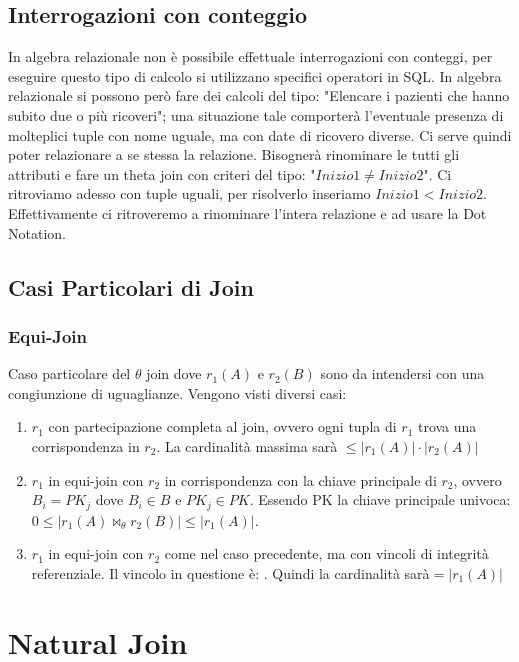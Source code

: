 \documentclass[10pt,twocolumn]{article}
\begin{document}
\subsection{Interrogazioni con conteggio}
In algebra relazionale non è possibile effettuale interrogazioni con conteggi, per eseguire questo tipo di calcolo si utilizzano specifici operatori in SQL. In algebra relazionale si possono però fare dei calcoli del tipo: "Elencare i pazienti che hanno subito due o più ricoveri"; una situazione tale comporterà l'eventuale presenza di molteplici tuple con nome uguale, ma con date di ricovero diverse. Ci serve quindi poter relazionare a se stessa la relazione.
\newline Bisognerà rinominare le tutti gli attributi e fare un theta join con criteri del tipo: "$Inizio1 \neq Inizio2$".
Ci ritroviamo adesso con tuple uguali, per risolverlo inseriamo $Inizio1 < Inizio2$.
Effettivamente ci ritroveremo a rinominare l'intera relazione e ad usare la Dot Notation.
\subsection{Casi Particolari di Join}
\subsubsection{Equi-Join}
Caso particolare del $\theta$ join dove $r_1(A)$ e $r_2(B)$ sono da intendersi con una congiunzione di uguaglianze.
Vengono visti diversi casi:
\begin{enumerate}
    \item $r_1$ con partecipazione completa al join, ovvero ogni tupla di $r_1$ trova una corrispondenza in $r_2$. La cardinalità massima sarà $\leq |r_1(A)|\cdot|r_2(A)|$
    \item $r_1$ in equi-join con $r_2$ in corrispondenza con la chiave principale di $r_2$, ovvero \newline $B_i = PK_j$ dove $B_i \in B$ e $PK_j \in PK$. Essendo PK la chiave principale univoca: \newline $0 \leq |r_1(A)\bowtie_\theta r_2(B)|\leq |r_1(A)|$.
    \item $r_1$ in equi-join con $r_2$ come nel caso precedente, ma con vincoli di integrità referenziale. Il vincolo in questione è: \newline [missing]. Quindi la cardinalità sarà\newline $= |r_1(A)|$ 
\end{enumerate}
\section{Natural Join}
\end{document}
